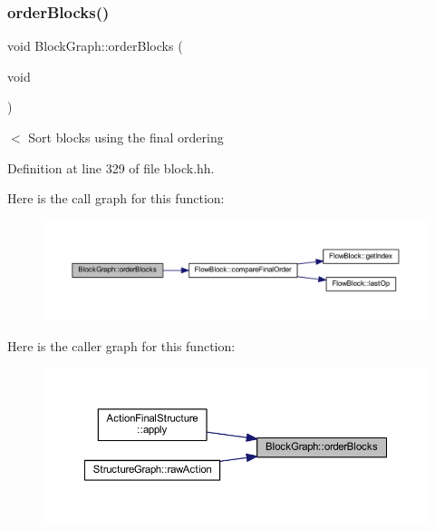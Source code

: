 \subsubsection{\texorpdfstring{orderBlocks()}{orderBlocks()}}
{\footnotesize\ttfamily void Block\+Graph\+::order\+Blocks (\begin{DoxyParamCaption}\item[{void}]{ }\end{DoxyParamCaption})\hspace{0.3cm}{\ttfamily [inline]}}

$<$ Sort blocks using the final ordering 

Definition at line 329 of file block.\+hh.

Here is the call graph for this function\+:
\nopagebreak
\begin{figure}[H]
\begin{center}
\leavevmode
\includegraphics[width=350pt]{class_block_graph_a1da91d469ca3583ac7408e90443f0e09_cgraph}
\end{center}
\end{figure}
Here is the caller graph for this function\+:
\nopagebreak
\begin{figure}[H]
\begin{center}
\leavevmode
\includegraphics[width=350pt]{class_block_graph_a1da91d469ca3583ac7408e90443f0e09_icgraph}
\end{center}
\end{figure}
\mbox{\label{class_block_graph_aaab258bf71213db644bb8e1764f81b1f}} 
